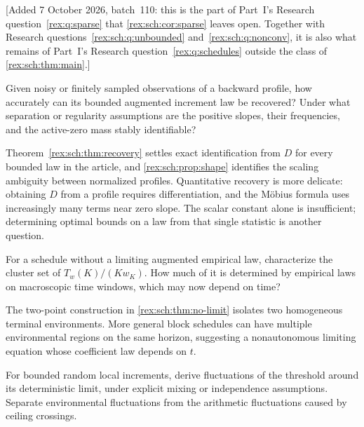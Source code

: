 [Added 7 October 2026, batch~110: this is the part of Part~I's Research
question~\ref{rex:q:sparse} that \cref{rex:sch:cor:sparse} leaves open.
Together with Research questions~\ref{rex:sch:q:unbounded}
and~\ref{rex:sch:q:nonconv}, it is also what remains of Part~I's Research
question~\ref{rex:q:schedules} outside the class of
\cref{rex:sch:thm:main}.]

\begin{question}\label{rex:sch:q:recovery}
Given noisy or finitely sampled observations of a backward profile,
how accurately can its bounded augmented increment law be recovered?
Under what separation or regularity assumptions are the positive
slopes, their frequencies, and the active-zero mass stably identifiable?
\end{question}

Theorem~\ref{rex:sch:thm:recovery} settles exact identification from $D$ for
every bounded law in the article, and \cref{rex:sch:prop:shape} identifies
the scaling ambiguity between normalized profiles. Quantitative
recovery is more delicate: obtaining $D$ from a profile requires
differentiation, and the M\"obius formula uses increasingly many terms
near zero slope. The scalar constant alone is insufficient; determining
optimal bounds on a law from that single statistic is another question.

\begin{question}\label{rex:sch:q:nonconv}
For a schedule without a limiting augmented empirical law,
characterize the cluster set of $T_w(K)/(K w_K)$. How much of it
is determined by empirical laws on macroscopic time windows,
which may now depend on time?
\end{question}

The two-point construction in \cref{rex:sch:thm:no-limit} isolates two
homogeneous terminal environments. More general block schedules
can have multiple environmental regions on the same horizon,
suggesting a nonautonomous limiting equation whose coefficient
law depends on $t$.

\begin{question}\label{rex:sch:q:random}
For bounded random local increments, derive fluctuations of the
threshold around its deterministic limit, under explicit mixing
or independence assumptions. Separate environmental fluctuations
from the arithmetic fluctuations caused by ceiling crossings.
\end{question}

